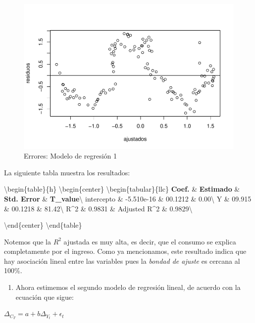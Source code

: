 \documentclass[
]{article}
\providecommand{\tightlist}{%
  \setlength{\itemsep}{0pt}\setlength{\parskip}{0pt}}
\begin{document}
\begin{figure}
\centering
\includegraphics{Ejercicio-3_files/figure-latex/unnamed-chunk-13-1.pdf}
\caption{Errores: Modelo de regresión 1}
\end{figure}

La siguiente tabla muestra los resultados:

\textbackslash begin\{table\}\{h\} \textbackslash begin\{center\}
\textbackslash begin\{tabular\}\{\textbar l\textbar l\textbar c\textbar\}
\textbf{Coef.} \& \textbf{Estimado} \& \textbf{Std. Error} \&
\textbf{T\_value}\textbackslash{} \hline intercepto \& -5.510e-16 \&
00.1212 \& 0.00\textbackslash{} \hline Y \& 09.915 \& 00.1218 \&
81.42\textbackslash{} \hline R\^{}2 \& 0.9831 \& Adjusted R\^{}2 \&
0.9829\textbackslash{} \hline

\caption{Resultados}

\textbackslash end\{center\} \textbackslash end\{table\}

Notemos que la \(R^2\) ajustada es muy alta, es decir, que el consumo se
explica completamente por el ingreso. Como ya mencionamos, este
resultado indica que hay asociación lineal entre las variables pues la
\emph{bondad de ajuste} es cercana al 100\%.

\begin{enumerate}
\def\labelenumi{\arabic{enumi}.}
\setcounter{enumi}{1}
\tightlist
\item
  Ahora estimemos el segundo modelo de regresión lineal, de acuerdo con
  la ecuación que sigue:
\end{enumerate}

\(\Delta_{C_T}=a+b\Delta_{Y_t}+\epsilon_t\)
\end{document}
